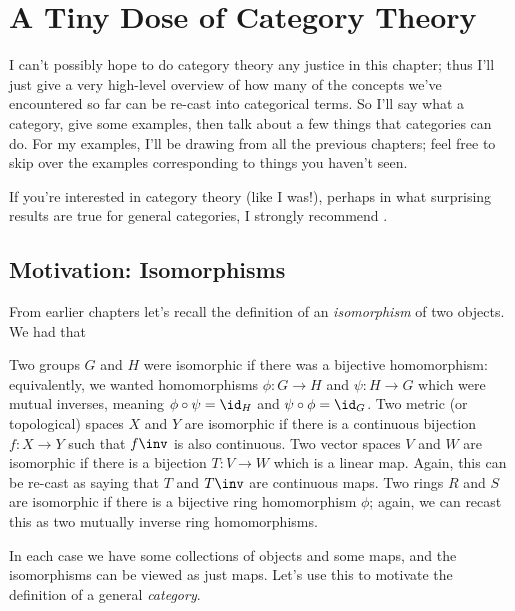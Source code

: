 \chapter{A Tiny Dose of Category Theory}
I can't possibly hope to do category theory any justice in this chapter;
thus I'll just give a very high-level overview of how many of the concepts we've
encountered so far can be re-cast into categorical terms.
So I'll say what a category, give some examples, then talk about a few things that
categories can do.
For my examples, I'll be drawing from all the previous chapters;
feel free to skip over the examples corresponding to things you haven't seen.

If you're interested in category theory (like I was!), perhaps in
what surprising results are true for general categories, I strongly recommend \cite{ref:msci}.

\section{Motivation: Isomorphisms}
From earlier chapters let's recall the definition of an \emph{isomorphism} of two objects.
We had that
\begin{itemize}
	\ii Two groups $G$ and $H$ were isomorphic if there was a bijective homomorphism:
	equivalently, we wanted homomorphisms $\phi : G \to H$ and $\psi : H \to G$
	which were mutual inverses, meaning $\phi \circ \psi = \id_H$ and $\psi \circ \phi = \id_G$.
	\ii Two metric (or topological) spaces $X$ and $Y$ are isomorphic
	if there is a continuous bijection $f : X \to Y$ such that $f\inv$ is also continuous.
	\ii Two vector spaces $V$ and $W$ are isomorphic if there is a bijection $T : V \to W$
	which is a linear map.
	Again, this can be re-cast as saying that $T$ and $T\inv$ are continuous maps.
	\ii Two rings $R$ and $S$ are isomorphic if there is a bijective ring homomorphism $\phi$;
	again, we can recast this as two mutually inverse ring homomorphisms.
\end{itemize}

In each case we have some collections of objects and some maps,
and the isomorphisms can be viewed as just maps.
Let's use this to motivate the definition of a general \emph{category}.

